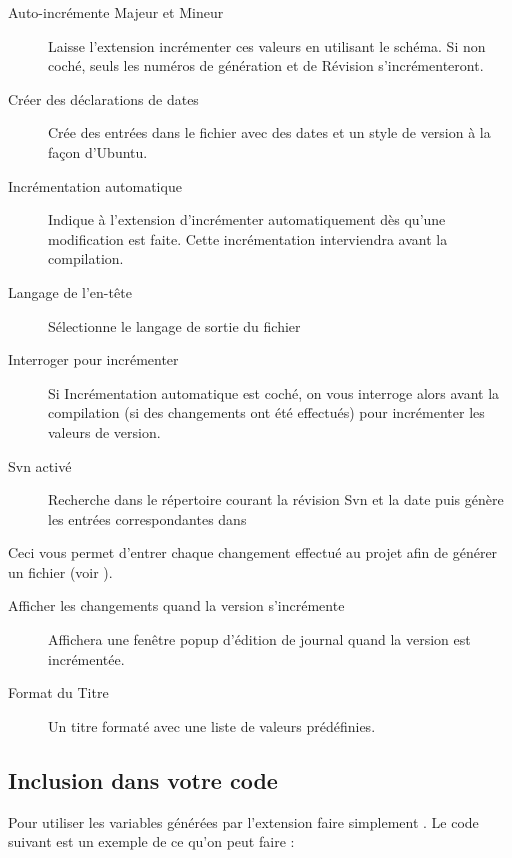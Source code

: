 
\begin{description}
\item[Auto-incrémente Majeur et Mineur] Laisse l'extension incrémenter ces valeurs en utilisant le schéma. Si non coché, seuls les numéros de génération et de Révision s'incrémenteront.
\item[Créer des déclarations de dates] Crée des entrées dans le fichier  avec des dates et un style de version à la façon d'Ubuntu.
\item[Incrémentation automatique] Indique à l'extension d'incrémenter automatiquement dès qu'une modification est faite. Cette incrémentation interviendra avant la compilation.
\item[Langage de l'en-tête] Sélectionne le langage de sortie du fichier 
\item[Interroger pour incrémenter] Si Incrémentation automatique est coché, on vous interroge alors avant la compilation (si des changements ont été effectués) pour incrémenter les valeurs de version.
\item[Svn activé] Recherche dans le répertoire courant la révision Svn et la date puis génère les entrées correspondantes dans 
\end{description}


Ceci vous permet d'entrer chaque changement effectué au projet afin de générer un fichier  (voir ).


\begin{description}
\item[Afficher les changements quand la version s'incrémente] Affichera une fenêtre popup d'édition de journal quand la version est incrémentée.
\item[Format du Titre] Un titre formaté avec une liste de valeurs prédéfinies.
\end{description}

\subsection{Inclusion dans votre code}

Pour utiliser les variables générées par l'extension faire simplement . Le code suivant est un exemple de ce qu'on peut faire :

